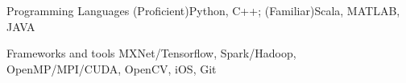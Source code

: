 

\begin{cvskills}

  \cvskill
    {Programming Languages} %
    {(Proficient)Python, C++; (Familiar)Scala, MATLAB, JAVA} %

  \cvskill
    {Frameworks and tools} %
    {MXNet/Tensorflow, Spark/Hadoop, OpenMP/MPI/CUDA, OpenCV, iOS, Git} %
    
  \vspace{0.01mm}


\end{cvskills}